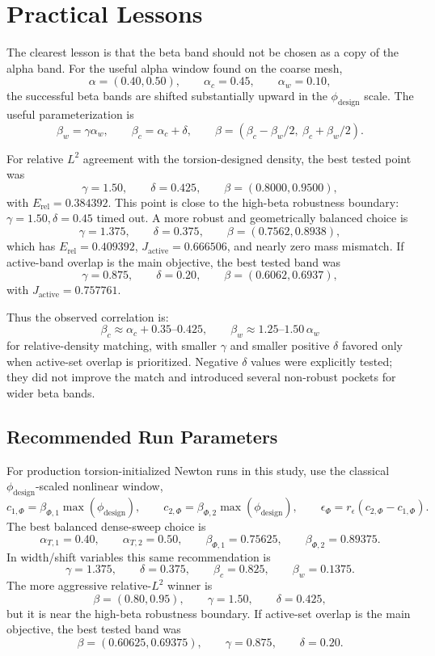 \documentclass[11pt]{article}
\begin{document}
\section{Practical Lessons}

The clearest lesson is that the beta band should not be chosen as a copy of the
alpha band.  For the useful alpha window found on the coarse mesh,
\[
\alpha=(0.40,0.50),\qquad \alpha_c=0.45,\qquad \alpha_w=0.10,
\]
the successful beta bands are shifted substantially upward in the
\(\phi_{\mathrm{design}}\) scale.  The useful parameterization is
\[
\beta_w=\gamma\alpha_w,\qquad
\beta_c=\alpha_c+\delta,\qquad
\beta=(\beta_c-\beta_w/2,\ \beta_c+\beta_w/2).
\]

For relative \(L^2\) agreement with the torsion-designed density, the best
tested point was
\[
\gamma=1.50,\qquad \delta=0.425,\qquad \beta=(0.8000,0.9500),
\]
with \(E_{\mathrm{rel}}=0.384392\).  This point is close to the high-beta
robustness boundary: \(\gamma=1.50,\delta=0.45\) timed out.  A more robust and
geometrically balanced choice is
\[
\gamma=1.375,\qquad \delta=0.375,\qquad \beta=(0.7562,0.8938),
\]
which has \(E_{\mathrm{rel}}=0.409392\), \(J_{\mathrm{active}}=0.666506\), and
nearly zero mass mismatch.  If active-band overlap is the main objective, the
best tested band was
\[
\gamma=0.875,\qquad \delta=0.20,\qquad \beta=(0.6062,0.6937),
\]
with \(J_{\mathrm{active}}=0.757761\).

Thus the observed correlation is:
\[
\beta_c \approx \alpha_c + 0.35\text{--}0.425,\qquad
\beta_w \approx 1.25\text{--}1.50\,\alpha_w
\]
for relative-density matching, with smaller \(\gamma\) and smaller positive
\(\delta\) favored only when active-set overlap is prioritized.  Negative
\(\delta\) values were explicitly tested; they did not improve the match and
introduced several non-robust pockets for wider beta bands.

\subsection{Recommended Run Parameters}

For production torsion-initialized Newton runs in this study, use the classical
\(\phi_{\mathrm{design}}\)-scaled nonlinear window,
\[
c_{1,\Phi}=\beta_{\Phi,1}\max(\phi_{\mathrm{design}}),\qquad
c_{2,\Phi}=\beta_{\Phi,2}\max(\phi_{\mathrm{design}}),\qquad
\epsilon_{\Phi}=r_{\epsilon}(c_{2,\Phi}-c_{1,\Phi}).
\]
The best balanced dense-sweep choice is
\[
\alpha_{T,1}=0.40,\qquad
\alpha_{T,2}=0.50,\qquad
\beta_{\Phi,1}=0.75625,\qquad
\beta_{\Phi,2}=0.89375.
\]
In width/shift variables this same recommendation is
\[
\gamma=1.375,\qquad
\delta=0.375,\qquad
\beta_c=0.825,\qquad
\beta_w=0.1375.
\]
The more aggressive relative-\(L^2\) winner is
\[
\beta=(0.80,0.95),\qquad \gamma=1.50,\qquad \delta=0.425,
\]
but it is near the high-beta robustness boundary.  If active-set overlap is
the main objective, the best tested band was
\[
\beta=(0.60625,0.69375),\qquad \gamma=0.875,\qquad \delta=0.20.
\]
\end{document}
